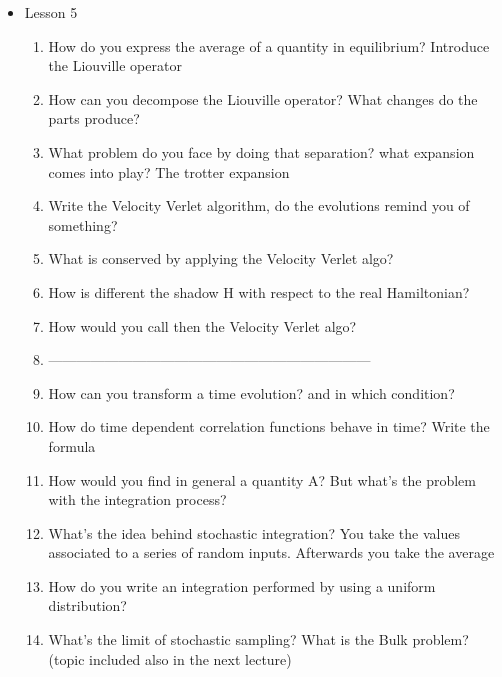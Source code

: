 {\begin{itemize}
\begin{enumerate}
        \item Write Euler integrator
        \item What is the problem with the Euler integrator?
        \item What is the Euler-Cromer integrator?
        \item What is the mathematical difference between the two previous integrators?
        \item What is the meaning of symplectic?
        \item What is a unitary matrix what is the case for the Euler-Cromer integrator?
    \end{enumerate}
    \item Lesson 5
    \begin{enumerate}
        \item How do you express the average of a quantity in equilibrium? Introduce the Liouville operator
        \item How can you decompose the Liouville operator? What changes do the parts produce?
        \item What problem do you face by doing that separation? what expansion comes into play? The trotter expansion
        \item Write the Velocity Verlet algorithm, do the evolutions remind you of something?
        \item What is conserved by applying the Velocity Verlet algo?
        \item How is different the shadow H with respect to the real Hamiltonian?
        \item How would you call then the Velocity Verlet algo?
        \item ---------------------------------------------------------------------
        \item How can you transform a time evolution? and in which condition?
        \item How do time dependent correlation functions behave in time? Write the formula
        \item How would you find in general a quantity A? But what's the problem with the integration process?
        \item What's the idea behind stochastic integration? You take the values associated to a series of random inputs. Afterwards you take the average
        \item How do you write an integration performed by using a uniform distribution?
        \item What's the limit of stochastic sampling? What is the Bulk problem? (topic included also in the next lecture)

\end{enumerate}
\end{itemize}}
